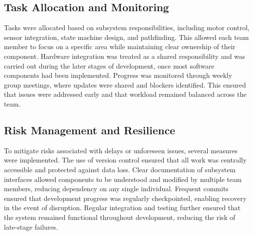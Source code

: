 \subsection{Task Allocation and Monitoring}
Tasks were allocated based on subsystem responsibilities, including motor control, sensor integration, state machine design, and pathfinding. This allowed each team member to focus on a specific area while maintaining clear ownership of their component.
Hardware integration was treated as a shared responsibility and was carried out during the later stages of development, once most software components had been implemented.
Progress was monitored through weekly group meetings, where updates were shared and blockers identified. This ensured that issues were addressed early and that workload remained balanced across the team.

\subsection{Risk Management and Resilience}
To mitigate risks associated with delays or unforeseen issues, several measures were implemented. The use of version control ensured that all work was centrally accessible and protected against data loss.
Clear documentation of subsystem interfaces allowed components to be understood and modified by multiple team members, reducing dependency on any single individual.
Frequent commits ensured that development progress was regularly checkpointed, enabling recovery in the event of disruption. Regular integration and testing further ensured that the system remained functional throughout development, reducing the risk of late-stage failures.
